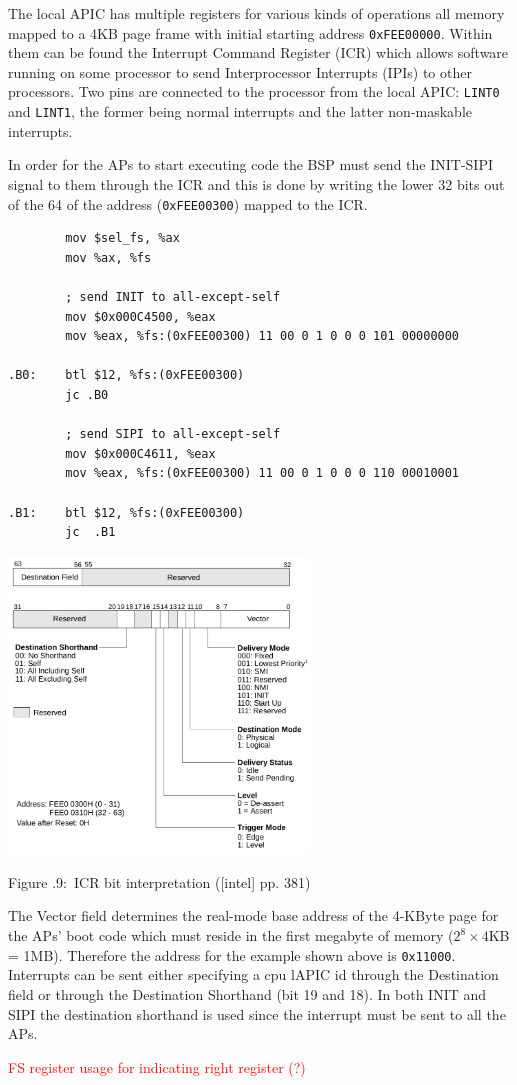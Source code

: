 \documentclass[twoside]{article}
\newcounter{lecnum}
\renewcommand{\cite}[1]{[#1]}
\newcommand{\fig}[3]{
            \vspace{#2}
            \begin{center}
            Figure \thelecnum.#1:~#3
            \end{center}
    }
\begin{document}
The local APIC has multiple registers for various kinds of operations all memory mapped to a 4KB page frame with initial starting address \texttt{0xFEE00000}. Within them can be found the Interrupt Command Register (ICR) which allows software running on some processor to send Interprocessor Interrupts (IPIs) to other processors. Two pins are connected to the processor from the local APIC: \texttt{LINT0} and \texttt{LINT1}, the former being normal interrupts and the latter non-maskable interrupts.

In order for the APs to start executing code the BSP must send the INIT-SIPI signal to them through the ICR and this is done by writing the lower 32 bits out of the 64 of the address (\texttt{0xFEE00300}) mapped to the ICR.

\marginnote{(\cite{intel} pp. 278}

\begin{verbatim}
        mov $sel_fs, %ax
        mov %ax, %fs
        
        ; send INIT to all-except-self
        mov $0x000C4500, %eax
        mov %eax, %fs:(0xFEE00300) 11 00 0 1 0 0 0 101 00000000

.B0:    btl $12, %fs:(0xFEE00300)
        jc .B0
        
        ; send SIPI to all-except-self
        mov $0x000C4611, %eax
        mov %eax, %fs:(0xFEE00300) 11 00 0 1 0 0 0 110 00010001

.B1:    btl $12, %fs:(0xFEE00300)
        jc  .B1
\end{verbatim}

\begin{center}
  \includegraphics[width=0.6\textwidth]{icr.png}
  \fig{9}{0 pt}{ICR bit interpretation (\cite{intel} pp. 381) }
\end{center}

The Vector field determines the real-mode base address of the 4-KByte page for the APs' boot code which must reside in the first megabyte of memory ($2^{8} \times 4$KB = 1MB). Therefore the address for the example shown above is \texttt{0x11000}. Interrupts can be sent either specifying a cpu lAPIC id through the Destination field or through the Destination Shorthand (bit 19 and 18). In both INIT and SIPI the destination shorthand is used since the interrupt must be sent to all
the APs.

\textcolor{red}{FS register usage for indicating right register (?)}

\newpage


\end{document}
